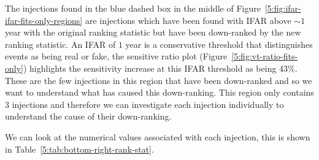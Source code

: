 The injections found in the blue dashed box in the middle of Figure~\ref{5:fig:ifar-ifar-fits-only-regions} are injections which have been found with IFAR above ${\sim}1$ year with the original ranking statistic but have been down-ranked by the new ranking statistic. An IFAR of $1$ year is a conservative threshold that distinguishes \gwadj events as being real or fake, the sensitive ratio plot (Figure~\ref{5:fig:vt-ratio-fits-only}) highlights the sensitivity increase at this IFAR threshold as being $43\%$. These are the few injections in this region that have been down-ranked and so we want to understand what has caused this down-ranking. This region only contains $3$ injections and therefore we can investigate each injection individually to understand the cause of their down-ranking.

We can look at the numerical values associated with each injection, this is shown in Table~\ref{5:tab:bottom-right-rank-stat}.
%
